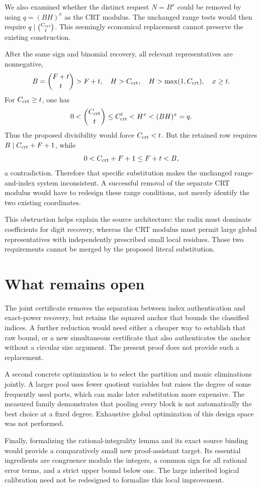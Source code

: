 \documentclass[11pt]{article}
\theoremstyle{definition}\newtheorem{definition}[theorem]{Definition}
\begin{document}
We also examined whether the distinct request $N=B^x$ could be removed by
using $q=(BH)^x$ as the CRT modulus. The unchanged range tests would then
require $q\mid\binom{C_{\rm crt}}{t}$. This seemingly economical
replacement cannot preserve the existing construction.

After the same sign and binomial recovery, all relevant representatives
are nonnegative,
\[
 B=\binom{F+t}{t}>F+t,\quad
 H>C_{\rm crt},\quad H>\max(1,C_{\rm crt}),\quad x\ge t.
\]
For $C_{\rm crt}\ge t$, one has
\[
 0<\binom{C_{\rm crt}}t
 \le C_{\rm crt}^t<H^x<(BH)^x=q.
\]
Thus the proposed divisibility would force $C_{\rm crt}<t$.
But the retained row requires $B\mid C_{\rm crt}+F+1$, while
\[
 0<C_{\rm crt}+F+1\le F+t<B,
\]
a contradiction. Therefore that specific substitution makes the
unchanged range-and-index system inconsistent. A successful removal of
the separate CRT modulus would have to redesign these range conditions,
not merely identify the two existing coordinates.

This obstruction helps explain the source architecture: the radix must
dominate coefficients for digit recovery, whereas the CRT modulus must
permit large global representatives with independently prescribed
small local residues. Those two requirements cannot be merged by the
proposed literal substitution.

\section{What remains open}

The joint certificate removes the separation between index authentication
and exact-power recovery, but retains the squared anchor that bounds
the classified indices. A further reduction would need either a cheaper
way to establish that raw bound, or a new simultaneous certificate that
also authenticates the anchor without a circular size argument. The
present proof does not provide such a replacement.

A second concrete optimization is to select the partition and monic
eliminations jointly. A larger pool uses fewer quotient variables but
raises the degree of some frequently used ports, which can make later
substitution more expensive. The measured family demonstrates that
pooling every block is not automatically the best choice at a fixed
degree. Exhaustive global optimization of this design space was not
performed.

Finally, formalizing the rational-integrality lemma and its exact source
binding would provide a comparatively small new proof-assistant target.
Its essential ingredients are congruence modulo the integers, a common
sign for all rational error terms, and a strict upper bound below one.
The large inherited logical calibration need not be redesigned to
formalize this local improvement.
\end{document}

